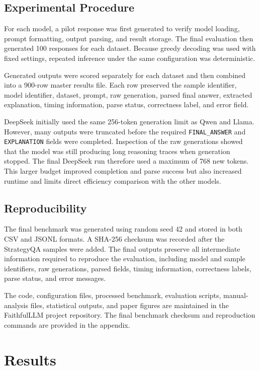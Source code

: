 \documentclass{article}
\begin{document}
\subsection{Experimental Procedure}

For each model, a pilot response was first generated to verify model
loading, prompt formatting, output parsing, and result storage. The
final evaluation then generated 100 responses for each dataset. Because
greedy decoding was used with fixed settings, repeated inference under
the same configuration was deterministic.

Generated outputs were scored separately for each dataset and then
combined into a 900-row master results file. Each row preserved the
sample identifier, model identifier, dataset, prompt, raw generation,
parsed final answer, extracted explanation, timing information, parse
status, correctness label, and error field.

DeepSeek initially used the same 256-token generation limit as Qwen and
Llama. However, many outputs were truncated before the required
\texttt{FINAL\_ANSWER} and \texttt{EXPLANATION} fields were completed.
Inspection of the raw generations showed that the model was still
producing long reasoning traces when generation stopped. The final
DeepSeek run therefore used a maximum of 768 new tokens. This larger
budget improved completion and parse success but also increased runtime
and limits direct efficiency comparison with the other models.

\subsection{Reproducibility}

The final benchmark was generated using random seed 42 and stored in
both CSV and JSONL formats. A SHA-256 checksum was recorded after the
StrategyQA samples were added. The final outputs preserve all
intermediate information required to reproduce the evaluation,
including model and sample identifiers, raw generations, parsed fields,
timing information, correctness labels, parse status, and error
messages.

The code, configuration files, processed benchmark, evaluation scripts,
manual-analysis files, statistical outputs, and paper figures are
maintained in the FaithfulLLM project repository. The final benchmark
checksum and reproduction commands are provided in the appendix.

\section{Results}
\end{document}

